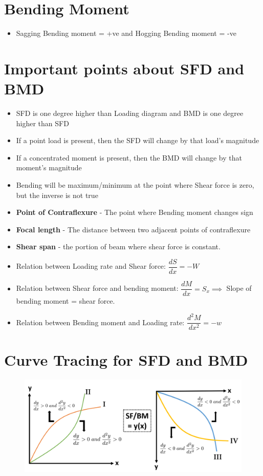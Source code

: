 \documentclass[8pt]{report}
\begin{document}
	\section{Bending Moment}
		\begin{itemize}
			\item Sagging Bending moment = +ve and Hogging Bending moment = -ve
		\end{itemize}\hrulefill
	\section{Important points about SFD and BMD}
		\begin{itemize}
			\item SFD is one degree higher than Loading diagram and BMD is one degree higher than SFD
			\item If a point load is present, then the SFD will change by that load's magnitude
			\item If a concentrated moment is present, then the BMD will change by that moment's magnitude
			\item Bending will be maximum/minimum at the point where Shear force is zero, but the inverse is not true
			\item \textbf{Point of Contraflexure} - The point where Bending moment changes sign
			\item \textbf{Focal length} - The distance between two adjacent points of contraflexure
			\item \textbf{Shear span} - the portion of beam where shear force is constant.
			\item Relation between Loading rate and Shear force: $\boxed{\dfrac{dS}{dx}=-W}$
			\item Relation between Shear force and bending moment: $\boxed{\dfrac{dM}{dx}=S_x}\implies$ Slope of bending moment = shear force.
			\item Relation between Bending moment and Loading rate: $\boxed{\dfrac{d^2M}{dx^2}=-w}$
		\end{itemize}\hrulefill
	\section{Curve Tracing for SFD and BMD}
			\begin{figure}[H]
				\centering
				\includegraphics[scale=0.4]{curvetracing.png}
			\end{figure}\hrulefill	%
\end{document}
